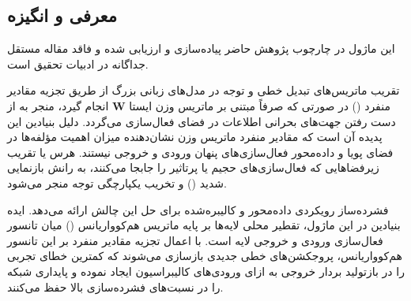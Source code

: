 \subsection{معرفی و انگیزه}
این ماژول در چارچوب پژوهش حاضر پیاده‌سازی و ارزیابی شده و فاقد مقاله مستقل جداگانه در ادبیات تحقیق است.

تقریب ماتریس‌های تبدیل خطی و توجه در مدل‌های زبانی بزرگ از طریق تجزیه مقادیر منفرد () در صورتی که صرفاً مبتنی بر ماتریس وزن ایستا $\mathbf{W}$ انجام گیرد، منجر به از دست رفتن جهت‌های بحرانی اطلاعات در فضای فعال‌سازی می‌گردد. دلیل بنیادین این پدیده آن است که مقادیر منفرد ماتریس وزن نشان‌دهنده میزان اهمیت مؤلفه‌ها در فضای پویا و داده‌محور فعال‌سازی‌های پنهان ورودی و خروجی نیستند. هرس یا تقریب زیرفضاهایی که فعال‌سازی‌های حجیم یا پرتاثیر را جابجا می‌کنند، به رانش بازنمایی شدید () و تخریب یکپارچگی توجه منجر می‌شود.

فشرده‌ساز  رویکردی داده‌محور و کالیبره‌شده برای حل این چالش ارائه می‌دهد. ایده بنیادین در این ماژول، تقطیر محلی لایه‌ها بر پایه ماتریس هم‌کوواریانس () میان تانسور فعال‌سازی ورودی و خروجی لایه است. با اعمال تجزیه مقادیر منفرد بر این تانسور هم‌کوواریانس، پروجکشن‌های خطی جدیدی بازسازی می‌شوند که کمترین خطای تجربی را در بازتولید بردار خروجی به ازای ورودی‌های کالیبراسیون ایجاد نموده و پایداری شبکه را در نسبت‌های فشرده‌سازی بالا حفظ می‌کنند.
